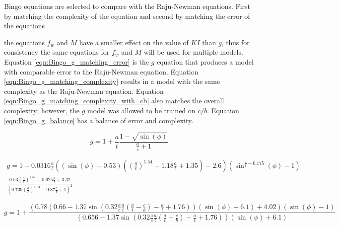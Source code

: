 Bingo equations are selected to compare with the Raju-Newman equations. First by matching the complexity of the equation and second by matching the error of the equations

the equations $f_w$ and $M$ have a smaller effect on the value of $KI$ than $g$, thus for consistency the same equations for $f_w$ and $M$ will be used for multiple models. Equation \ref{eqn:Bingo_g_matching_error} is the $g$ equation that produces a model with comparable error to the Raju-Newman equation. Equation \ref{eqn:Bingo_g_matching_complexity} results in a model with the same complexity as the Raju-Newman equation. Equation \ref{eqn:Bingo_g_matching_complexity_with_cb} also matches the overall complexity; however, the $g$ model was allowed to be trained on $c/b$. Equation \ref{eqn:Bingo_g_balance} has a balance of error and complexity. 

\begin{equation} \label{eqn:Bingo_g_matching_error}
    g = 1 + \frac{a}{t} \frac{1 - \sqrt{\sin \left( \phi \right)}}{\frac{a}{c} + 1}
\end{equation}

\begin{equation} \label{eqn:Bingo_g_matching_complexity}
\begin{gathered}
   g = 1 + 0.0316 \frac{a}{c} \left( \left( \sin\left(\phi\right) - 0.53 \right) \left( \left( \frac{a}{c} \right) ^ 1.54 - 1.18 \frac{a}{t} + 1.35 \right) - 2.6 \right) \left( \sin ^{\frac{a}{t} + 0.175}\left(\phi\right) - 1 \right) \\
   \frac{0.53 \left( \frac{a}{c} \right) ^ 1.54 - 0.625 \frac{a}{t} + 3.32}{\left( 0.739 \left( \frac{a}{c} \right) ^ 1.54 - 0.87 \frac{a}{t} + 1 \right) ^ 2} 
\end{gathered}
\end{equation}

\begin{equation} \label{eqn:Bingo_g_matching_complexity_with_cb}
    g = 1 + \frac{{\left({0.78}{\left({0.66}-{1.37} \sin{{\left({0.32}\frac{a}{{c}}\frac{a}{{t}}{\left(\frac{a}{{t}}-\frac{c}{{b}}\right)}-\frac{a}{{t}}+{1.76}\right)}}\right)}{\left( \sin{{\left(\phi\right)}}+{6.1}\right)}+{4.02}\right)}{\left( \sin{{\left(\phi\right)}}-{1}\right)}}{{{\left({0.656}-{1.37} \sin{{\left({0.32}\frac{a}{{c}}\frac{a}{{t}}{\left(\frac{a}{{t}}-\frac{c}{{b}}\right)}-\frac{a}{{t}}+{1.76}\right)}}\right)}{\left( \sin{{\left(\phi\right)}}+{6.1}\right)}}}
\end{equation}

